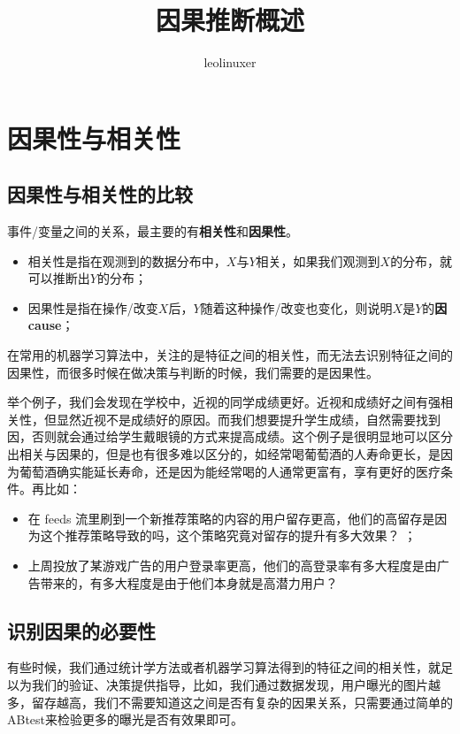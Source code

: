 \documentclass[12pt]{article}
\title{因果推断概述\cite{Causal_Inference_Simply_Introduction}\cite{Talk_About_Causal_Inference_Part_1}}
\author{leolinuxer}
\begin{document}
\maketitle
\tableofcontents

\section{因果性与相关性}
\subsection{因果性与相关性的比较}
事件/变量之间的关系，最主要的有\textbf{相关性}和\textbf{因果性}。
\begin{itemize}
\setlength{\itemsep}{0pt}
\setlength{\parsep}{0pt}
\setlength{\parskip}{0pt}
    \item 相关性是指在观测到的数据分布中，$X$与$Y$相关，如果我们观测到$X$的分布，就可以推断出$Y$的分布；
    \item 因果性是指在操作/改变$X$后，$Y$随着这种操作/改变也变化，则说明$X$是$Y$的\textbf{因cause}；
\end{itemize}

在常用的机器学习算法中，关注的是特征之间的相关性，而无法去识别特征之间的因果性，而很多时候在做决策与判断的时候，我们需要的是因果性。

举个例子，我们会发现在学校中，近视的同学成绩更好。近视和成绩好之间有强相关性，但显然近视不是成绩好的原因。而我们想要提升学生成绩，自然需要找到因，否则就会通过给学生戴眼镜的方式来提高成绩。这个例子是很明显地可以区分出相关与因果的，但是也有很多难以区分的，如经常喝葡萄酒的人寿命更长，是因为葡萄酒确实能延长寿命，还是因为能经常喝的人通常更富有，享有更好的医疗条件。再比如：
\begin{itemize}
\setlength{\itemsep}{0pt}
\setlength{\parsep}{0pt}
\setlength{\parskip}{0pt}
    \item 在 feeds 流里刷到一个新推荐策略的内容的用户留存更高，他们的高留存是因为这个推荐策略导致的吗，这个策略究竟对留存的提升有多大效果？
；
    \item 上周投放了某游戏广告的用户登录率更高，他们的高登录率有多大程度是由广告带来的，有多大程度是由于他们本身就是高潜力用户？
\end{itemize}


\subsection{识别因果的必要性}
有些时候，我们通过统计学方法或者机器学习算法得到的特征之间的相关性，就足以为我们的验证、决策提供指导，比如，我们通过数据发现，用户曝光的图片越多，留存越高，我们不需要知道这之间是否有复杂的因果关系，只需要通过简单的ABtest来检验更多的曝光是否有效果即可。
\end{document}
